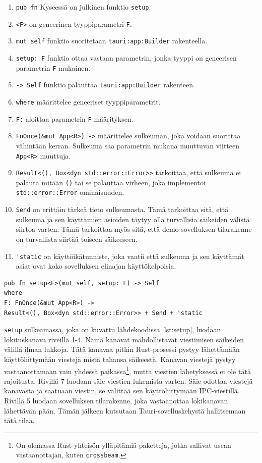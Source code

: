 \documentclass[a4paper,12pt]{article}
\begin{document}
    \begin{enumerate}
        \item \lstinline{pub fn} Kyseessä on julkinen funktio \lstinline{setup}.
        \item \lstinline{<F>} on geneerinen tyyppiparametri \lstinline{F}.
        \item \lstinline{mut self} funktio suoritetaan \lstinline{tauri:app:Builder} rakenteella.
        \item \lstinline{setup: F} funktio ottaa vastaan parametrin, jonka tyyppi on geneerisen parametrin \lstinline{F} mukainen.
        \item \lstinline{-> Self} funktio palauttaa \lstinline{tauri:app:Builder} rakenteen.
        \item \lstinline{where} määrittelee geneeriset tyyppiparametrit.
        \item \lstinline{F:} aloittaa parametrin \lstinline{F} määrityksen.
        \item \lstinline{FnOnce(&mut App<R>) ->} määrittelee sulkeuman, joka voidaan suorittaa vähintään kerran. Sulkeuma saa parametrin mukana muuttuvan viitteen \lstinline{App<R>} muuttuja.
        \item \lstinline{Result<(), Box<dyn std::error::Error>>} tarkoittaa, että sulkeuma ei palauta mitään \lstinline{()} tai se palauttaa virheen, joka implementoi \lstinline{std::error::Error} ominaisuuden.
        \item \lstinline{Send} on erittäin tärkeä tieto sulkeumasta. Tämä tarkoittaa sitä, että sulkeuma ja sen käyttämien asioiden täytyy olla turvallisia säikeiden välistä siirtoa varten. Tämä tarkoittaa myös sitä, että demo-sovelluksen tilarakenne on turvallista siirtää toiseen säikeeseen.
        \item \lstinline{'static} on käyttöikätunniste, joka vaatii että sulkeuma ja sen käyttämät asiat ovat koko sovelluksen elinajan käyttökelpoisia.
    \end{enumerate}

    \begin{lstlisting}[caption={Setup-funktion tunniste}, label={lst:setup_signature}]
pub fn setup<F>(mut self, setup: F) -> Self
where
F: FnOnce(&mut App<R>) ->
Result<(), Box<dyn std::error::Error>> + Send + 'static
    \end{lstlisting}


    \lstinline{setup} sulkeamassa, joka on kuvattu lähdekoodissa \ref{lst:setup}, luodaan lokituskanava riveillä 1-4. Nämä kanavat mahdollistavat viestimisen säikeiden välillä ilman lukkoja. Tätä kanavaa pitkin Rust-prosessi pystyy lähettämään käyttöliittymään viestejä mistä tahansa säikeestä. Kanavan viestejä pystyy vastaanottamaan vain yhdessä paikassa\footnote{On olemassa Rust-yhteisön ylläpitämiä paketteja, jotka sallivat usean vastaanottajan, kuten \lstinline{crossbeam}.}, mutta viestien lähetyksessä ei ole tätä rajoitusta\cite[ch. 16.2]{rust-book}. Rivillä 7 luodaan säie viestien lukemista varten. Säie odottaa viestejä kanavasta ja saatuaan viestin, se välittää sen käyttöliittymään IPC-viestillä. Rivillä 5 luodaan sovelluksen tilarakenne, joka vastaanottaa lokikanavan lähettävän pään. Tämän jälkeen kutsutaan Tauri-sovelluskehystä hallitsemaan tätä tilaa.
    
\end{document}
